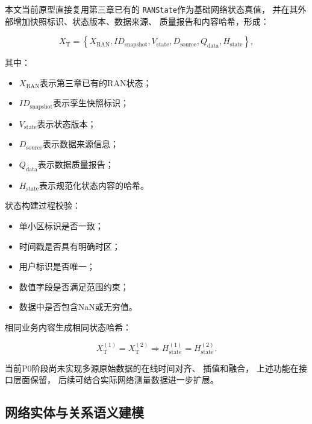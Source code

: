 \documentclass[lang=cn,12pt]{elegantbook}
\begin{document}
本文当前原型直接复用第三章已有的
\texttt{RANState}作为基础网络状态真值，
并在其外部增加快照标识、状态版本、数据来源、
质量报告和内容哈希，形成：

\begin{equation}
X_{\mathrm{T}}
=
\left\{
X_{\mathrm{RAN}},
ID_{\mathrm{snapshot}},
V_{\mathrm{state}},
D_{\mathrm{source}},
Q_{\mathrm{data}},
H_{\mathrm{state}}
\right\},
\label{eq:twin_state_construction}
\end{equation}

其中：

\begin{itemize}
    \item $X_{\mathrm{RAN}}$表示第三章已有的RAN状态；
    \item $ID_{\mathrm{snapshot}}$表示孪生快照标识；
    \item $V_{\mathrm{state}}$表示状态版本；
    \item $D_{\mathrm{source}}$表示数据来源信息；
    \item $Q_{\mathrm{data}}$表示数据质量报告；
    \item $H_{\mathrm{state}}$表示规范化状态内容的哈希。
\end{itemize}

状态构建过程校验：

\begin{itemize}
    \item 单小区标识是否一致；
    \item 时间戳是否具有明确时区；
    \item 用户标识是否唯一；
    \item 数值字段是否满足范围约束；
    \item 数据中是否包含NaN或无穷值。
\end{itemize}

相同业务内容生成相同状态哈希：

\begin{equation}
X_{\mathrm{T}}^{(1)}
=
X_{\mathrm{T}}^{(2)}
\Rightarrow
H_{\mathrm{state}}^{(1)}
=
H_{\mathrm{state}}^{(2)}.
\label{eq:twin_state_hash_determinism}
\end{equation}

当前P0阶段尚未实现多源原始数据的在线时间对齐、
插值和融合，
上述功能在接口层面保留，
后续可结合实际网络测量数据进一步扩展。


\subsection*{网络实体与关系语义建模}
\end{document}

